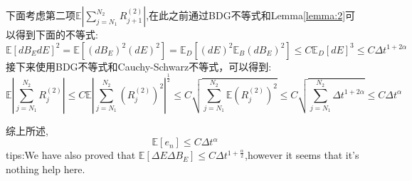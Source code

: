 \documentclass[12pt,final]{article}
\makeatletter
\numberwithin{equation}{section}
\numberwithin{figure}{section}
\numberwithin{table}{section}
\theoremstyle{plain}
\renewcommand{\proofname}{proof}
\theoremstyle{definition}
\theoremstyle{remark}
\renewenvironment{proof}[1][\proofname]{\par
  \pushQED{\qed}%
  \normalfont \topsep6\p@\@plus6\p@\relax
  \trivlist\item[\hskip\labelsep
  \bfseries #1\@addpunct{\,:\,}]\ignorespaces
}{%
  \popQED\endtrivlist\@endpefalse
}
\makeatother
\begin{document}
\begin{proof}
下面考虑第二项$\mathbb{E}|\sum\limits_{j=N_1}^{N_2}R_{j+1}^{(2)}|$,在此之前通过BDG不等式和Lemma\ref{lemma:2}可以得到下面的不等式:
\begin{equation}
	\mathbb{E}[dB_EdE]^2=\mathbb{E}[(dB_E)^2(dE)^2]=\mathbb{E}_D[(dE)^2\mathbb{E}_B(dB_E)^2]\leq
	C\mathbb{E}_{D}[dE]^3\leq C\Delta t ^{1+2\alpha}
\end{equation}
接下来使用BDG不等式和Cauchy-Schwarz不等式，可以得到:
\begin{equation*}
	\mathbb{E}\left|\sum_{j=N_1}^{N_2}R_{j}^{(2)}\right|  \le C\mathbb{E} \left|\sum_{j=N_1}^{N_2}(R_{j}^{(2)})^2\right|^{\frac{1}{2}} \le C\sqrt{\sum_{j=N_1}^{N_2}\mathbb{E}(R_{j}^{(2)})^2}
	\le C\sqrt{\sum_{j=N_1}^{N_2}\Delta t^{1+2\alpha}} \le C\Delta t^{\alpha}
\end{equation*}


综上所述,
\begin{equation*}
	\mathbb{E} [e_n] \leq C\Delta t^\alpha
\end{equation*}
\end{proof}
tips:We have also proved that $\mathbb{E} [\Delta E \Delta B_E ] \le C\Delta t ^{1+\frac{\alpha}{2}}$,however it seems that it's nothing help here.
\end{document}
